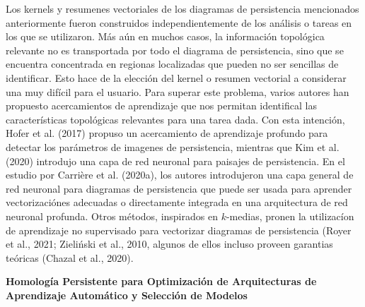 Los kernels y resumenes vectoriales de los diagramas de persistencia mencionados anteriormente
fueron construidos independientemente de los an\'alisis o tareas en los que se utilizaron.
M\'as a\'un en muchos casos, la informaci\'on topol\'ogica relevante no es transportada por
todo el diagrama de persistencia, sino que se encuentra concentrada en regionas localizadas
que pueden no ser sencillas de identificar. Esto hace de la elecci\'on del kernel
o resumen vectorial a considerar una muy dif\'icil para el usuario.
Para superar este problema, varios autores han propuesto acercamientos de aprendizaje que nos
permitan identifical las caracter\'isticas topol\'ogicas relevantes para una tarea dada.
Con esta intenci\'on, Hofer et al. (2017)\cite{Hofer2017} propuso un acercamiento de
aprendizaje profundo para detectar los par\'ametros de imagenes de persistencia,
mientras que Kim et al. (2020)\cite{Kim2020} introdujo una capa de red neuronal para
paisajes de persistencia.
En el estudio por Carri\`ere et al. (2020a)\cite{Carriere2020a}, los autores introdujeron
una capa general de red neuronal para diagramas de persistencia que puede ser usada para
aprender vectorizaci\'ones adecuadas o directamente integrada en una arquitectura de
red neuronal profunda.
Otros m\'etodos, inspirados en $k$-medias, pronen la utilizac\'ion de aprendizaje no supervisado
para vectorizar diagramas de persistencia
(Royer et al., 2021\cite{Royer2021}; Zieli\'nski et al., 2010\cite{Ziel2010},
algunos de ellos incluso proveen garantias te\'oricas
(Chazal et al., 2020\cite{Chazal2020}).\medskip\medskip


\textbf{\large Homolog\'ia Persistente para Optimizaci\'on de
Arquitecturas de Aprendizaje Autom\'atico y Selecci\'on de Modelos}

